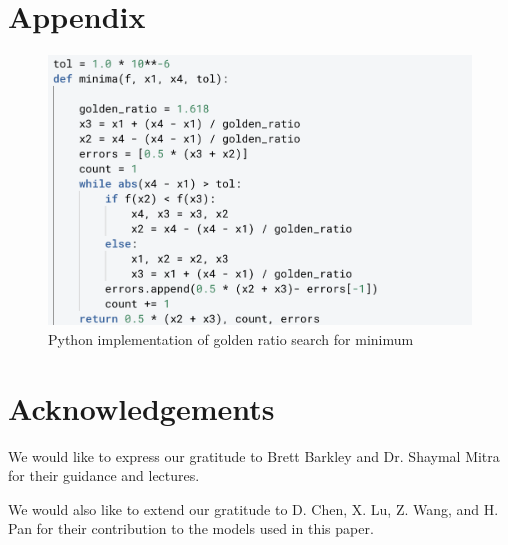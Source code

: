 \documentclass[linenumbers,RNAAS,trackchanges]{aastex631}
\begin{document}
\section{Appendix} \label{sec:appendix}
\begin{figure}[H]
    \centering
    \includegraphics[scale=.75]{code.png}
    \caption{Python implementation of golden ratio search for minimum}
    \label{fig:code}
\end{figure}

\cite{5333075}
\cite{10.2307/2032161}
\cite{8709593}
\cite{stakhov_2014}

\newpage



\section{Acknowledgements} \label{sec:acknowledgements}
We would like to express our gratitude to Brett Barkley and Dr. Shaymal Mitra for their guidance and lectures. 

We would also like to extend our gratitude to D. Chen, X. Lu, Z. Wang, and H. Pan for their contribution to the models used in this paper. 
\end{document}
